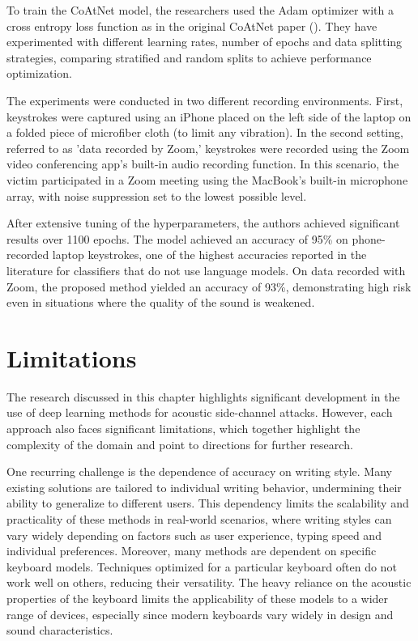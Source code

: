 \documentclass[a4paper,11pt,twoside]{report}
\theoremstyle{definition}
\begin{document}
To train the CoAtNet model, the researchers used the Adam optimizer with a cross entropy loss function as in the original CoAtNet paper (\textit{\cite{coatnet2021}}). They have experimented with different learning rates, number of epochs and data splitting strategies, comparing stratified and random splits to achieve performance optimization.

The experiments were conducted in two different recording environments. First, keystrokes were captured using an iPhone placed on the left side of the laptop on a folded piece of microfiber cloth (to limit any vibration). In the second setting, referred to as 'data recorded by Zoom,' keystrokes were recorded using the Zoom video conferencing app's built-in audio recording function. In this scenario, the victim participated in a Zoom meeting using the MacBook's built-in microphone array, with noise suppression set to the lowest possible level.

After extensive tuning of the hyperparameters, the authors achieved significant results over 1100 epochs. The model achieved an accuracy of 95\% on phone-recorded laptop keystrokes, one of the highest accuracies reported in the literature for classifiers that do not use language models. On data recorded with Zoom, the proposed method yielded an accuracy of 93\%, demonstrating high risk even in situations where the quality of the sound is weakened.

\section{Limitations}

The research discussed in this chapter highlights significant development in the use of deep learning methods for acoustic side-channel attacks. However, each approach also faces significant limitations, which together highlight the complexity of the domain and point to directions for further research.

One recurring challenge is the dependence of accuracy on writing style. Many existing solutions are tailored to individual writing behavior, undermining their ability to generalize to different users. This dependency limits the scalability and practicality of these methods in real-world scenarios, where writing styles can vary widely depending on factors such as user experience, typing speed and individual preferences. Moreover, many methods are dependent on specific keyboard models. Techniques optimized for a particular keyboard often do not work well on others, reducing their versatility. The heavy reliance on the acoustic properties of the keyboard limits the applicability of these models to a wider range of devices, especially since modern keyboards vary widely in design and sound characteristics.
\end{document}
